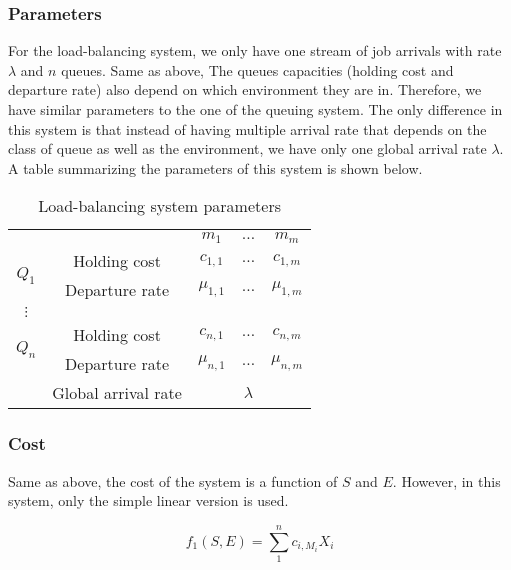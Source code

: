 \documentclass[
  a4paper, xcolor = usenames,dvipsnames]{article}
\begin{document}
\hypertarget{parameters-1}{%
\subsubsection{Parameters}\label{parameters-1}}

For the load-balancing system, we only have one stream of job arrivals with rate \(\lambda\) and \(n\) queues. Same as above, The queues capacities (holding cost and departure rate) also depend on which environment they are in. Therefore, we have similar parameters to the one of the queuing system. The only difference in this system is that instead of having multiple arrival rate that depends on the class of queue as well as the environment, we have only one global arrival rate \(\lambda\). A table summarizing the parameters of this system is shown below.

\begin{table}[ht]
\caption{Load-balancing system parameters}
\begin{center}
\begin{tabular}{c c c c c}
    \hline
    \multicolumn{2}{c}{} & $m_{1}$ & $\dots$ & $m_{m}$ \\
    \cline{2-5}
    \multirow{2}{*}{$Q_{1}$} &  Holding cost & $c_{1, 1}$ & $\dots$ & $c_{1, m}$ \\
    & Departure rate & $\mu_{1, 1}$ & $\dots$ & $\mu_{1, m}$ \\
    \cline{2-5}
    $\vdots$  \\
    \cline{2-5}
    \multirow{2}{*}{$Q_{n}$} &  Holding cost & $c_{n, 1}$ & $\dots$ & $c_{n, m}$ \\
    & Departure rate & $\mu_{n, 1}$ & $\dots$ & $\mu_{n, m}$ \\
    \cline{2-5}
    & Global arrival rate & & $\lambda$ & \\
    \hline
\end{tabular}
\end{center}
\label{tab:lbs-param}
\end{table}

\hypertarget{cost-1}{%
\subsubsection{Cost}\label{cost-1}}

Same as above, the cost of the system is a function of \(S\) and \(E\). However, in this system, only the simple linear version is used.

\[
f_{1}(S, E) = \sum_{1}^{n} c_{i, M_{i}} X_{i}
\]
\end{document}

